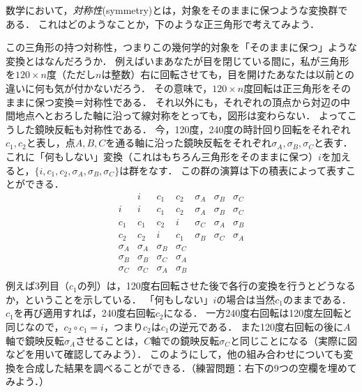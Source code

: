 \documentclass[11pt,a4paper]{jsarticle}
\begin{document}
数学において，\emph{対称性}(symmetry)とは，対象をそのままに保つような変換群である．
これはどのようなことか，下のような正三角形で考えてみよう．
\begin{center}
\end{center}
この三角形の持つ対称性，つまりこの幾何学的対象を「そのままに保つ」ような変換とはなんだろうか．
例えばいまあなたが目を閉じている間に，私が三角形を$120\times n$度（ただし$n$は整数）右に回転させても，目を開けたあなたは以前との違いに何も気が付かないだろう．
その意味で，$120\times n$度回転は正三角形をそのままに保つ変換＝対称性である．
それ以外にも，それぞれの頂点から対辺の中間地点へとおろした軸に沿って線対称をとっても，図形は変わらない．
よってこうした鏡映反転も対称性である．
今，120度，240度の時計回り回転をそれぞれ$c_1, c_2$と表し，点$A, B, C$を通る軸に沿った鏡映反転をそれぞれ$\sigma_A, \sigma_B, \sigma_C$と表す．
これに「何もしない」変換（これはもちろん三角形をそのままに保つ）$i$を加えると，$\{i, c_1, c_2, \sigma_A, \sigma_B, \sigma_C\}$は群をなす．
この群の演算は下の積表によって表すことができる．
\[
\begin{array}{c|cccccc}
       & i & c_1 & c_2 & \sigma_A & \sigma_B & \sigma_C \\ \hline
       i & i & c_1 & c_2 & \sigma_A & \sigma_B & \sigma_C \\ 
       c_1 & c_1 & c_2 & i &  \sigma_C & \sigma_A & \sigma_B  \\ 
       c_2 & c_2 & i & c_1 &  \sigma_B & \sigma_C & \sigma_A \\ 
       \sigma_A & \sigma_A & \sigma_B & \sigma_C &  &  &  \\ 
       \sigma_B & \sigma_B & \sigma_C & \sigma_A & & &  \\ 
       \sigma_C & \sigma_C & \sigma_A & \sigma_B & &  &  \\ 
     
\end{array}
\]
例えば3列目（$c_1$の列）は，120度右回転させた後で各行の変換を行うとどうなるか，ということを示している．
「何もしない」$i$の場合は当然$c_1$のままである．
$c_1$を再び適用すれば，240度右回転$c_2$になる．
一方240度右回転は120度左回転と同じなので，$c_2 \circ c_1 = i$，つまり$c_2$は$c_1$の逆元である．
また120度右回転の後に$A$軸で鏡映反転$\sigma_A$させることは，$C$軸での鏡映反転$\sigma_C$と同じことになる（実際に図などを用いて確認してみよう）．
このようにして，他の組み合わせについても変換を合成した結果を調べることができる．（練習問題：右下の9つの空欄を埋めてみよう．）
\end{document}
